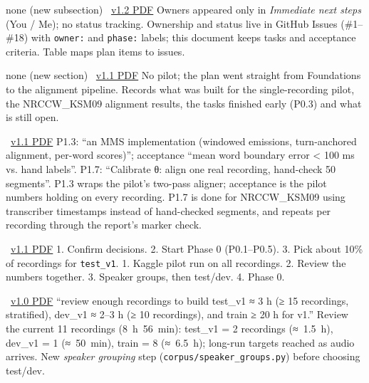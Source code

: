 \documentclass[11pt]{article}
\begin{document}
 {none (new subsection) \textperiodcentered\ \href{archive/v1.2/06_IMPLEMENTATION_PLAN.pdf}{v1.2 PDF}}
 {Owners appeared only in \emph{Immediate next steps} (You / Me); no status tracking.}
 {Ownership and status live in GitHub Issues (\#1--\#18) with \texttt{owner:} and \texttt{phase:} labels; this document keeps tasks and acceptance criteria. Table maps plan items to issues.}

 {none (new section) \textperiodcentered\ \href{archive/v1.1/06_IMPLEMENTATION_PLAN.pdf}{v1.1 PDF}}
 {No pilot; the plan went straight from Foundations to the alignment pipeline.}
 {Records what was built for the single-recording pilot, the NRCCW\_KSM09 alignment results, the tasks finished early (P0.3) and what is still open.}

 { \textperiodcentered\ \href{archive/v1.1/06_IMPLEMENTATION_PLAN.pdf}{v1.1 PDF}}
 {P1.3: ``an MMS implementation (windowed emissions, turn-anchored alignment, per-word scores)''; acceptance ``mean word boundary error < 100 ms vs. hand labels''. P1.7: ``Calibrate θ: align one real recording, hand-check 50 segments''.}
 {P1.3 wraps the pilot's two-pass aligner; acceptance is the pilot numbers holding on every recording. P1.7 is done for NRCCW\_KSM09 using transcriber timestamps instead of hand-checked segments, and repeats per recording through the report's marker check.}

 { \textperiodcentered\ \href{archive/v1.1/06_IMPLEMENTATION_PLAN.pdf}{v1.1 PDF}}
 {1. Confirm decisions. 2. Start Phase 0 (P0.1--P0.5). 3. Pick about 10\% of recordings for \texttt{test\_v1}.}
 {1. Kaggle pilot run on all recordings. 2. Review the numbers together. 3. Speaker groups, then test/dev. 4. Phase 0.}

 { \textperiodcentered\ \href{archive/v1.0/06_IMPLEMENTATION_PLAN.pdf}{v1.0 PDF}}
 {``review enough recordings to build test\_v1 ≈ 3 h (≥ 15 recordings, stratified), dev\_v1 ≈ 2--3 h (≥ 10 recordings), and train ≥ 20 h for v1.''}
 {Review the current 11 recordings (8~h~56~min): test\_v1 = 2 recordings (≈~1.5~h), dev\_v1 = 1 (≈~50~min), train = 8 (≈~6.5~h); long-run targets reached as audio arrives. New \emph{speaker grouping} step (\texttt{corpus/speaker\_groups.py}) before choosing test/dev.}
\end{document}
